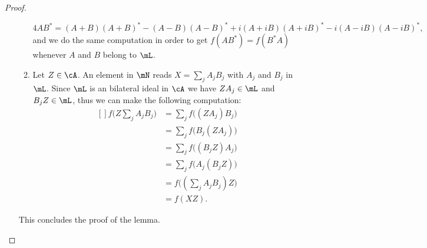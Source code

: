 \begin{proof}
\begin{enumerate}
\begin{enumerate}
\begin{equation}
                        4AB^*=(A+B)(A+B)^*-(A-B)(A-B)^*+i(A+iB)(A+iB)^*-i(A-iB)(A-iB)^*,
                    \end{equation}
                    and we do the same computation in order to get $f(AB^*)=f(B^*A)$ whenever $A$ and $B$ belong to $\mL$.
                \item
                    Let $Z\in\cA$. An element in $\mN$ reads $X=\sum_jA_jB_j$ with $A_j$ and $B_j$ in $\mL$. Since $\mL$ is an bilateral ideal in $\cA$ we have $ZA_j\in\mL$ and $B_jZ\in\mL$, thus we can make the following computation:
                    \begin{equation}
                        \begin{aligned}[]
                            f\big( Z\sum_jA_jB_j \big)&=\sum_jf\big( (ZA_j)B_j \big)\\
                            &=\sum_jf\big( B_j(ZA_j) \big)\\
                            &=\sum_jf\big( (B_jZ)A_j \big)\\
                            &=\sum_jf\big( A_j(B_jZ) \big)\\
                            &=f\big( (\sum_jA_jB_j)Z \big)\\
                            &=f(XZ).
                        \end{aligned}
                    \end{equation}
            \end{enumerate}
            This concludes the proof of the lemma.
    \end{enumerate}


\end{proof}
